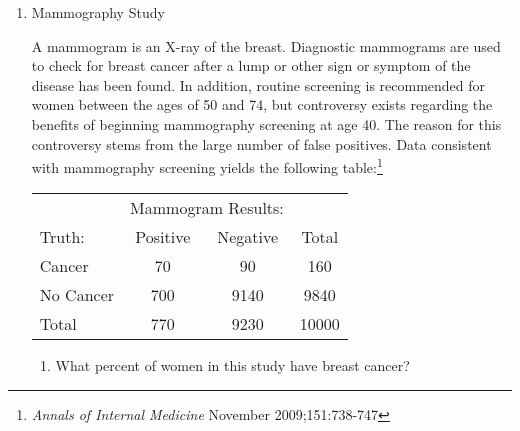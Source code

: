 \begin{enumerate}
\begin{enumerate}
\item  Are the percentages reported above (14.9\% and 19.5\%)
  population values or sample values?  Explain. 
\begin{students}
  \vspace{2cm}
\end{students} 

\begin{key}
  {\it Sample proportions.  We cannot take a census to find the true
    population proportions.}
\end{key}
\item  Write out the null model for this analysis. 
\begin{students}
  \vspace{4cm}
\end{students} 
 
\begin{key}
  
\end{key}
\end{enumerate}


\begin{students}
\newpage
\end{students}

\item Mammography Study

A mammogram is an X-ray of the breast.  Diagnostic mammograms are used
to check for breast cancer after a lump or other sign or symptom of
the disease has been found.  In addition, routine screening is
recommended for women between the ages of 50 and 74, but controversy
exists regarding the benefits of beginning mammography screening at
age 40. The reason for this controversy stems from the large number
of false positives.  Data consistent with mammography screening yields
the following table:\footnote{{\it Annals of Internal Medicine}
  November 2009;151:738-747} 


\begin{tabular}{|l|c|c|c|}\hline
   & \multicolumn{2}{|c|}{Mammogram Results:}& \\
Truth: & Positive & Negative & Total\\\hline
Cancer & 70 & 90 & 160\\ \hline
No Cancer& 700& 9140&9840\\ \hline\hline
Total& 770 & 9230 & 10000\\ \hline
\end{tabular}

\begin{enumerate}
   \item   What percent of women in this study have breast cancer?
\begin{students}
  \vspace{\fill}
\end{students} 


\end{enumerate}
\end{enumerate}
